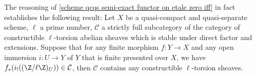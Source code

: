 \begin{remark}
The reasoning of \cref{scheme qcqs semi-exact functor on etale zero iff} in fact establishes the following result: Let $X$ be a quasi-compact and quasi-separate scheme, $\ell$ a prime number, $\mathcal{C}$ a strictly full subcategory of the category of constructible $\ell$-torsion abelian sheaves which is stable under direct factor and extensions. Suppose that for any finite morphism $f:Y\to X$ and any open immersion $i:U\to Y$ of $Y$ that is finite presented over $X$, we have $f_*(i_!((\Z/\ell\Z)_U))\in\mathcal{C}$, then $\mathcal{C}$ contains any constructible $\ell$-torsion sheaves.
\end{remark}